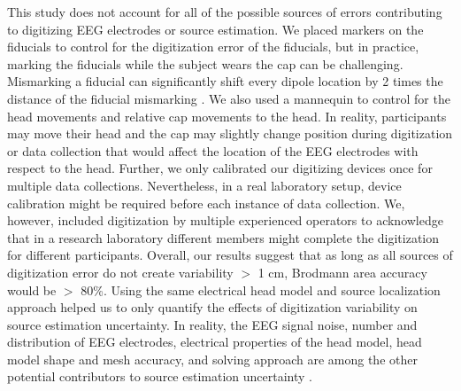 \documentclass{UCF_ETD}
\renewcommand{\ul}{}
\begin{document}
\ul{This study does not account for all of the possible sources of errors contributing to digitizing EEG electrodes or source estimation. We placed markers on the fiducials to control for the digitization error of the fiducials, but in practice, marking the fiducials while the subject wears the cap can be challenging. Mismarking a fiducial can significantly shift every dipole location by 2 times the distance of the fiducial mismarking \citep{Shirazi2019-ke}. We also used a mannequin to control for the head movements and relative cap movements to the head. In reality, participants may move their head and the cap may slightly change position during digitization or data collection that would affect the location of the EEG electrodes with respect to the head. Further, we only calibrated our digitizing devices once for multiple data collections. Nevertheless, in a real laboratory setup, device calibration might be required before each instance of data collection. We, however, included digitization by multiple experienced operators to acknowledge that in a research laboratory different members might complete the digitization for different participants. Overall, our results suggest that as long as all sources of digitization error do not create variability $>$ 1 cm, Brodmann area accuracy would be $>$ 80\%. Using the same electrical head model and source localization approach helped us to only quantify the effects of digitization variability on source estimation uncertainty. In reality, the EEG signal noise, number and distribution of EEG electrodes, electrical properties of the head model, head model shape and mesh accuracy, and solving approach are among the other potential contributors to source estimation uncertainty \citep{Akalin_Acar2013-rv,Akalin_Acar2016-jr,Mahjoory2017-jv,Dalal2014-nk,Song2015-fv,Beltrachini2019-lf}.}
\end{document}
